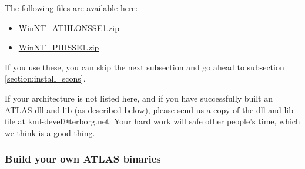 \documentclass{article}
\begin{document}
The following files are available here:
\begin{itemize}
\item \href{research/kml/WinNT\_ATHLONSSE1.zip}{WinNT\_ATHLONSSE1.zip}
\item \href{research/kml/WinNT\_PIIISSE1.zip}{WinNT\_PIIISSE1.zip}
\end{itemize}
If you use these, you can skip the next subsection and go ahead to 
subsection \ref{section:install_scons}.

If your architecture is not listed here, and if you have successfully 
built an ATLAS dll and lib (as described below), please send us a copy of the dll and
lib file at kml-devel@terborg.net. Your hard work will safe 
other people's time, which we think is a good thing.

\subsubsection{Build your own ATLAS binaries}
\end{document}
